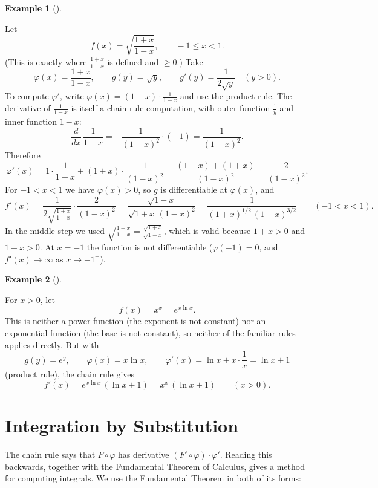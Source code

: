 \documentclass[
  letterpaper,
  DIV=11,
  numbers=noendperiod]{scrreprt}
\theoremstyle{plain}
\theoremstyle{plain}
\theoremstyle{definition}
\theoremstyle{definition}
\theoremstyle{definition}
\newtheorem{example}{Example}[chapter]
\theoremstyle{plain}
\theoremstyle{plain}
\theoremstyle{remark}
\begin{document}
\begin{example}[]\protect\hypertarget{exm-chain-sqrt-quotient}{}\label{exm-chain-sqrt-quotient}

\hfill\break
Let \[
f(x) = \sqrt{\frac{1+x}{1-x}}, \qquad -1\le x<1 .
\] (This is exactly where \(\frac{1+x}{1-x}\) is defined and \(\ge0\).)
Take \[
\varphi(x) = \frac{1+x}{1-x}, \qquad g(y) = \sqrt{y}, \qquad g'(y) = \frac{1}{2\sqrt y}\quad (y>0).
\] To compute \(\varphi'\), write
\(\varphi(x) = (1+x)\cdot\frac{1}{1-x}\) and use the product rule. The
derivative of \(\frac{1}{1-x}\) is itself a chain rule computation, with
outer function \(\frac1y\) and inner function \(1-x\): \[
\frac{d}{dx}\,\frac{1}{1-x} = -\frac{1}{(1-x)^2}\cdot(-1) = \frac{1}{(1-x)^2}.
\] Therefore \[
\varphi'(x) = 1\cdot\frac{1}{1-x} + (1+x)\cdot\frac{1}{(1-x)^2}
= \frac{(1-x)+(1+x)}{(1-x)^2} = \frac{2}{(1-x)^2}.
\] For \(-1<x<1\) we have \(\varphi(x)>0\), so \(g\) is differentiable
at \(\varphi(x)\), and \[
f'(x) = \frac{1}{2\sqrt{\frac{1+x}{1-x}}}\cdot\frac{2}{(1-x)^2}
= \frac{\sqrt{1-x}}{\sqrt{1+x}\,(1-x)^2}
= \frac{1}{(1+x)^{1/2}\,(1-x)^{3/2}} \qquad (-1<x<1).
\] In the middle step we used
\(\sqrt{\frac{1+x}{1-x}} = \frac{\sqrt{1+x}}{\sqrt{1-x}}\), which is
valid because \(1+x>0\) and \(1-x>0\). At \(x=-1\) the function is not
differentiable (\(\varphi(-1)=0\), and \(f'(x)\to\infty\) as
\(x\to-1^+\)).

\end{example}

\begin{example}[]\protect\hypertarget{exm-chain-x-to-x}{}\label{exm-chain-x-to-x}

\hfill\break
For \(x>0\), let \[
f(x) = x^x = e^{x\ln x}.
\] This is neither a power function (the exponent is not constant) nor
an exponential function (the base is not constant), so neither of the
familiar rules applies directly. But with \[
g(y) = e^y, \qquad \varphi(x) = x\ln x, \qquad \varphi'(x) = \ln x + x\cdot\frac1x = \ln x + 1
\] (product rule), the chain rule gives \[
f'(x) = e^{x\ln x}\,(\ln x+1) = x^x\,(\ln x+1) \qquad (x>0).
\]

\end{example}

\section{Integration by Substitution}\label{integration-by-substitution}

The chain rule says that \(F\circ\varphi\) has derivative
\((F'\circ\varphi)\cdot\varphi'\). Reading this backwards, together with
the Fundamental Theorem of Calculus, gives a method for computing
integrals. We use the Fundamental Theorem in both of its forms:
\end{document}

